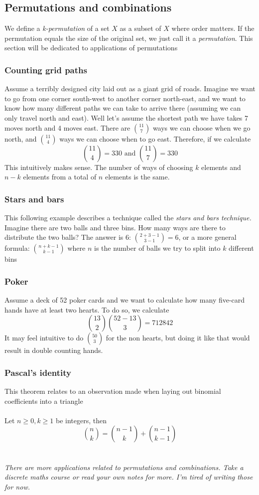 \documentclass{article}
\begin{document}
\subsection{Permutations and combinations}
We define a \textit{k-permutation} of a set $X$ as a subset of $X$ where order matters. If the permutation equals the size of the original set, we just call it a \textit{permutation}. This section will be dedicated to applications of permutations
\subsubsection{Counting grid paths}
Assume a terribly designed city laid out as a giant grid of roads. Imagine we want to go from one corner south-west to another corner north-east, and we want to know how many different paths we can take to arrive there (assuming we can only travel north and east). Well let's assume the shortest path we have takes 7 moves north and 4 moves east. There are ${11\choose 7}$ ways we can choose when we go north, and ${11\choose 4}$ ways we can choose when to go east. Therefore, if we calculate
\[{11 \choose 4} = 330  \text{ and } {11 \choose 7} = 330\]
This intuitively makes sense. The number of ways of choosing $k$ elements and $n-k$ elements from a total of $n$ elements is the same.
\subsubsection{Stars and bars}
This following example describes a technique called the \textit{stars and bars technique.} Imagine there are two balls and three bins. How many ways are there to distribute the two balls? The answer is 6: ${2+3-1\choose 3-1} = 6$, or a more general formula: ${n+k-1 \choose k-1}$ where $n$ is the number of balls we try to split into $k$ different bins
\subsubsection{Poker}
Assume a deck of 52 poker cards and we want to calculate how many five-card hands have at least two hearts. To do so, we calculate 
\[{13\choose 2}{52-13\choose 3} = 712842\]
It may feel intuitive to do ${50 \choose 3}$ for the non hearts, but doing it like that would result in double counting hands.

\subsubsection{Pascal's identity}
This theorem relates to an observation made when laying out binomial coefficients into a triangle
\\\\
Let $n\ge 0, k\ge 1$ be integers, then
\[{n \choose k} = {n-1 \choose k} + {n-1 \choose k-1}\]
\\\\
\textit{There are more applications related to permutations and combinations. Take a discrete maths course or read your own notes for more. I'm tired of writing those for now.}
\end{document}
